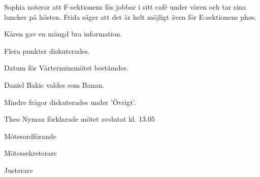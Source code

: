 \documentclass[10pt]{article}
\def\mo{Theo Nyman}
\def\ms{Hannes Björk}
\def\ji{Rasmus Sobel}
\begin{document}
\begin{paragrafer}
Sophia noterar att F-sektionens fös jobbar i sitt café under våren och tar sina luncher på hösten.
Frida säger att det är helt möjligt även för E-sektionens phøs.


Kåren gav en mängd bra information.

Flera punkter diskuterades.

Datum för Vårterminsmötet bestämdes.

Daniel Bakic valdes som Banan.

Mindre frågor diskuterades under 'Övrigt'.

{\mo} förklarade mötet avslutat kl. 13.05
\end{paragrafer}

\hidesignfoot
\begin{signatures}{3}
\signature{\mo}{Mötesordförande}
\signature{\ms}{Mötessekreterare}
\signature{\ji}{Justerare}
\end{signatures}
\end{document}
